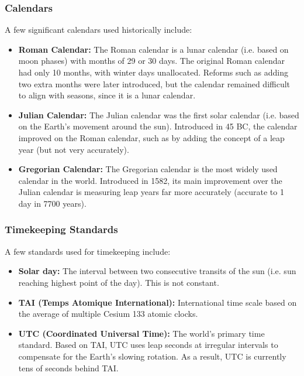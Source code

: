 \documentclass[12pt,titlepage]{article}
\begin{document}
      \subsubsection{Calendars}
        A few significant calendars used historically include:
        \begin{itemize}
          \item \textbf{Roman Calendar:} The Roman calendar is a lunar calendar (i.e. based on moon phases) with months of 29 or 30 days. The original Roman
            calendar had only 10 months, with winter days unallocated. Reforms such as adding two extra months were later introduced, but the calendar remained
            difficult to align with seasons, since it is a lunar calendar.
          \item \textbf{Julian Calendar:} The Julian calendar was the first solar calendar (i.e. based on the Earth's movement around the sun). Introduced in
            45 BC, the calendar improved on the Roman calendar, such as by adding the concept of a leap year (but not very accurately).
          \item \textbf{Gregorian Calendar:} The Gregorian calendar is the most widely used calendar in the world. Introduced in 1582, its main improvement
            over the Julian calendar is measuring leap years far more accurately (accurate to 1 day in 7700 years).
        \end{itemize}

      \subsubsection{Timekeeping Standards}
        A few standards used for timekeeping include:
        \begin{itemize}
          \item \textbf{Solar day:} The interval between two consecutive transits of the sun (i.e. sun reaching highest point of the day). This is not constant.
          \item \textbf{TAI (Temps Atomique International):} International time scale based on the average of multiple Cesium 133 atomic clocks.
          \item \textbf{UTC (Coordinated Universal Time):} The world's primary time standard. Based on TAI, UTC uses leap seconds at irregular intervals to
              compensate for the Earth's slowing rotation. As a result, UTC is currently tens of seconds behind TAI.
        \end{itemize}
\end{document}

